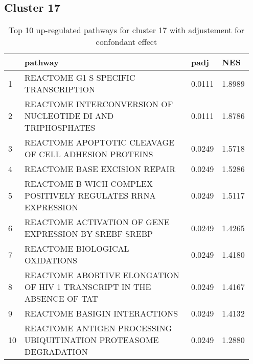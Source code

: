 \documentclass{article}
\begin{document}
\subsection{Cluster 17 }
\begin{table}[H]
\centering
\begin{tabular}{p{0.05\linewidth}p{0.7\linewidth}p{0.1\linewidth}p{0.1\linewidth}}
  \hline
 & pathway & padj & NES \\ 
  \hline
1 & REACTOME G1 S SPECIFIC TRANSCRIPTION & 0.0111 & 1.8989 \\ 
  2 & REACTOME INTERCONVERSION OF NUCLEOTIDE DI AND TRIPHOSPHATES & 0.0111 & 1.8786 \\ 
  3 & REACTOME APOPTOTIC CLEAVAGE OF CELL ADHESION PROTEINS & 0.0249 & 1.5718 \\ 
  4 & REACTOME BASE EXCISION REPAIR & 0.0249 & 1.5286 \\ 
  5 & REACTOME B WICH COMPLEX POSITIVELY REGULATES RRNA EXPRESSION & 0.0249 & 1.5117 \\ 
  6 & REACTOME ACTIVATION OF GENE EXPRESSION BY SREBF SREBP & 0.0249 & 1.4265 \\ 
  7 & REACTOME BIOLOGICAL OXIDATIONS & 0.0249 & 1.4180 \\ 
  8 & REACTOME ABORTIVE ELONGATION OF HIV 1 TRANSCRIPT IN THE ABSENCE OF TAT & 0.0249 & 1.4167 \\ 
  9 & REACTOME BASIGIN INTERACTIONS & 0.0249 & 1.4132 \\ 
  10 & REACTOME ANTIGEN PROCESSING UBIQUITINATION PROTEASOME DEGRADATION & 0.0249 & 1.2880 \\ 
   \hline
\end{tabular}
\caption{Top 10 up-regulated pathways for cluster 17 with adjustement for confondant effect} 
\label{tab:q3_2_conf_17}
\end{table}
\end{document}

